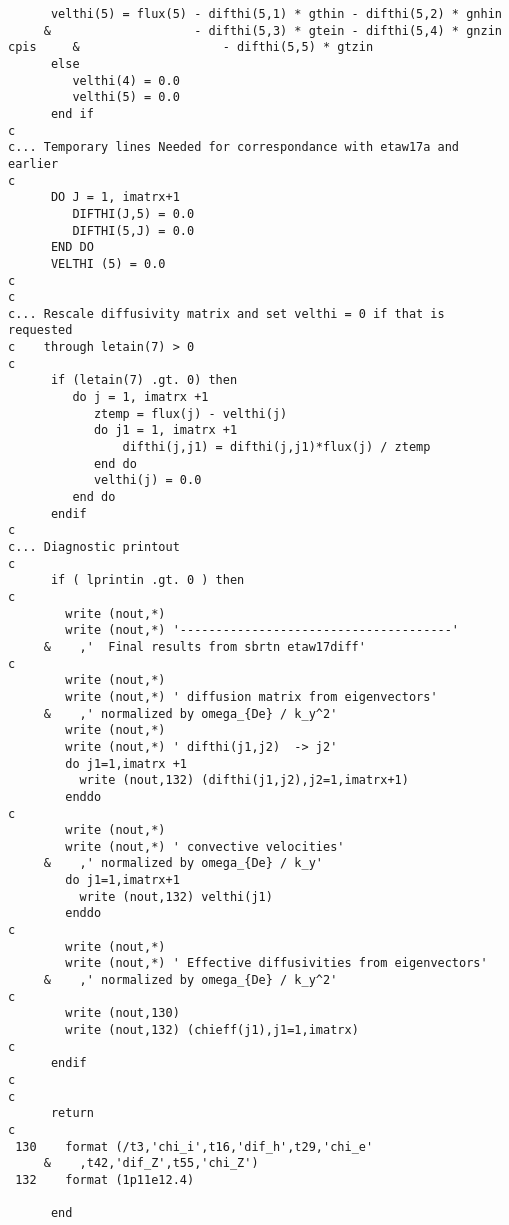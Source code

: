 \begin{verbatim}
      velthi(5) = flux(5) - difthi(5,1) * gthin - difthi(5,2) * gnhin
     &                    - difthi(5,3) * gtein - difthi(5,4) * gnzin
cpis     &                    - difthi(5,5) * gtzin
      else
         velthi(4) = 0.0
         velthi(5) = 0.0
      end if
c
c... Temporary lines Needed for correspondance with etaw17a and earlier
c
      DO J = 1, imatrx+1
         DIFTHI(J,5) = 0.0
         DIFTHI(5,J) = 0.0
      END DO
      VELTHI (5) = 0.0
c
c
c... Rescale diffusivity matrix and set velthi = 0 if that is requested
c    through letain(7) > 0
c      
      if (letain(7) .gt. 0) then
         do j = 1, imatrx +1
            ztemp = flux(j) - velthi(j)
            do j1 = 1, imatrx +1
                difthi(j,j1) = difthi(j,j1)*flux(j) / ztemp
            end do
            velthi(j) = 0.0
         end do
      endif
c
c... Diagnostic printout
c
      if ( lprintin .gt. 0 ) then
c
        write (nout,*)
        write (nout,*) '--------------------------------------'
     &    ,'  Final results from sbrtn etaw17diff'
c
        write (nout,*)
        write (nout,*) ' diffusion matrix from eigenvectors'
     &    ,' normalized by omega_{De} / k_y^2'
        write (nout,*)
        write (nout,*) ' difthi(j1,j2)  -> j2'
        do j1=1,imatrx +1
          write (nout,132) (difthi(j1,j2),j2=1,imatrx+1)
        enddo
c
        write (nout,*)
        write (nout,*) ' convective velocities'
     &    ,' normalized by omega_{De} / k_y'
        do j1=1,imatrx+1
          write (nout,132) velthi(j1)
        enddo
c
        write (nout,*)
        write (nout,*) ' Effective diffusivities from eigenvectors'
     &    ,' normalized by omega_{De} / k_y^2'
c
        write (nout,130)
        write (nout,132) (chieff(j1),j1=1,imatrx)
c
      endif
c
c
      return
c
 130    format (/t3,'chi_i',t16,'dif_h',t29,'chi_e'
     &    ,t42,'dif_Z',t55,'chi_Z')
 132    format (1p11e12.4)

      end
\end{verbatim}





